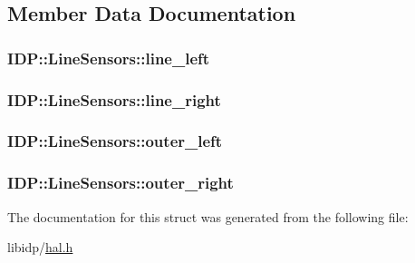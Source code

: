 \subsection{Member Data Documentation}
\hypertarget{structIDP_1_1LineSensors_ab986b625016c2f99536299b6d0af3f29}{
\subsubsection[{line\_\-left}]{ {\bf IDP::LineSensors::line\_\-left}}}
\label{structIDP_1_1LineSensors_ab986b625016c2f99536299b6d0af3f29}
\hypertarget{structIDP_1_1LineSensors_a03e1692ac462e2e6744c9d5a7656c6f1}{
\subsubsection[{line\_\-right}]{ {\bf IDP::LineSensors::line\_\-right}}}
\label{structIDP_1_1LineSensors_a03e1692ac462e2e6744c9d5a7656c6f1}
\hypertarget{structIDP_1_1LineSensors_a009bf6abf88cf3c732545da20148ba5e}{
\subsubsection[{outer\_\-left}]{ {\bf IDP::LineSensors::outer\_\-left}}}
\label{structIDP_1_1LineSensors_a009bf6abf88cf3c732545da20148ba5e}
\hypertarget{structIDP_1_1LineSensors_afa87dc008f415429d15e35a49d52083c}{
\subsubsection[{outer\_\-right}]{ {\bf IDP::LineSensors::outer\_\-right}}}
\label{structIDP_1_1LineSensors_afa87dc008f415429d15e35a49d52083c}


The documentation for this struct was generated from the following file:\begin{DoxyCompactItemize}
\item 
libidp/\hyperlink{hal_8h}{hal.h}\end{DoxyCompactItemize}
